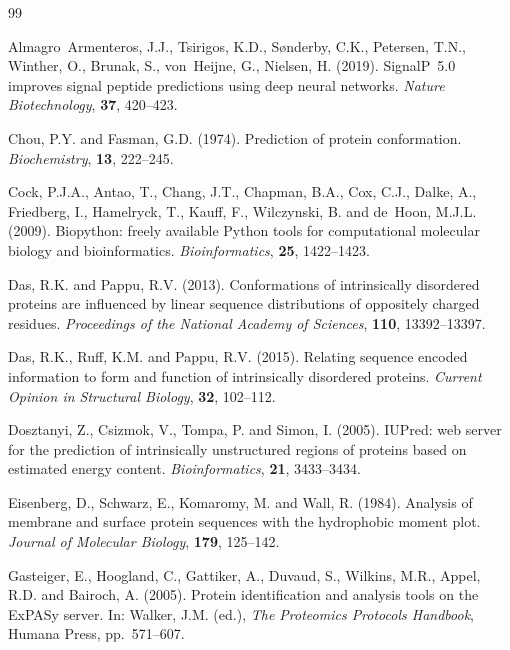 \documentclass[12pt]{article}
\begin{document}
\begin{thebibliography}{99}

Almagro~Armenteros, J.J., Tsirigos, K.D., S{\o}nderby, C.K., Petersen, T.N.,
Winther, O., Brunak, S., von~Heijne, G., Nielsen, H. (2019).
SignalP~5.0 improves signal peptide predictions using deep neural networks.
\textit{Nature Biotechnology}, \textbf{37}, 420--423.

Chou, P.Y. and Fasman, G.D. (1974).
Prediction of protein conformation.
\textit{Biochemistry}, \textbf{13}, 222--245.

Cock, P.J.A., Antao, T., Chang, J.T., Chapman, B.A., Cox, C.J., Dalke, A.,
Friedberg, I., Hamelryck, T., Kauff, F., Wilczynski, B. and de~Hoon, M.J.L.
(2009).
Biopython: freely available Python tools for computational molecular biology
and bioinformatics.
\textit{Bioinformatics}, \textbf{25}, 1422--1423.

Das, R.K. and Pappu, R.V. (2013).
Conformations of intrinsically disordered proteins are influenced by linear
sequence distributions of oppositely charged residues.
\textit{Proceedings of the National Academy of Sciences}, \textbf{110},
13392--13397.

Das, R.K., Ruff, K.M. and Pappu, R.V. (2015).
Relating sequence encoded information to form and function of intrinsically
disordered proteins.
\textit{Current Opinion in Structural Biology}, \textbf{32}, 102--112.

Dosztanyi, Z., Csizmok, V., Tompa, P. and Simon, I. (2005).
IUPred: web server for the prediction of intrinsically unstructured regions
of proteins based on estimated energy content.
\textit{Bioinformatics}, \textbf{21}, 3433--3434.

Eisenberg, D., Schwarz, E., Komaromy, M. and Wall, R. (1984).
Analysis of membrane and surface protein sequences with the hydrophobic
moment plot.
\textit{Journal of Molecular Biology}, \textbf{179}, 125--142.

Gasteiger, E., Hoogland, C., Gattiker, A., Duvaud, S., Wilkins, M.R.,
Appel, R.D. and Bairoch, A. (2005).
Protein identification and analysis tools on the ExPASy server.
In: Walker, J.M. (ed.), \textit{The Proteomics Protocols Handbook},
Humana Press, pp.\ 571--607.


\end{thebibliography}
\end{document}
